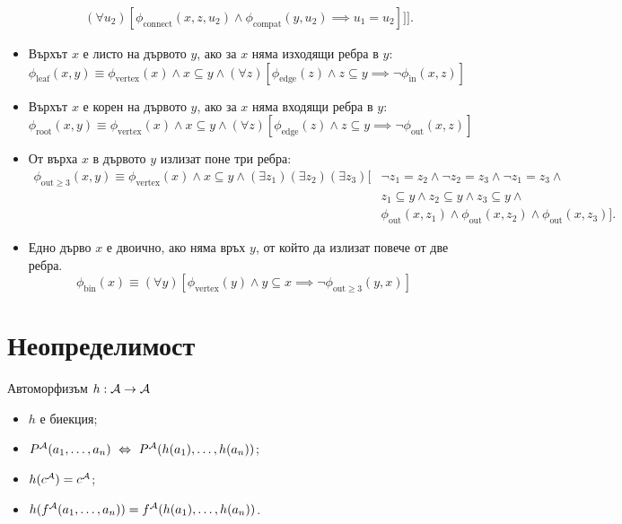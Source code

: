 \begin{problem}
\begin{itemize}
\begin{align*}
                                 & (\forall u_2)[\phi_{\text{connect}}(x,z,u_2) \land \phi_{\text{compat}}(y,u_2) \implies u_1 = u_2]]].
    \end{align*}
  \item
    Върхът $x$ е листо на дървото $y$, ако за $x$ няма изходящи ребра в $y$:
    \[\phi_{\text{leaf}}(x,y) \equiv \phi_{\text{vertex}}(x) \land x \subseteq y \land (\forall z)[\phi_{\text{edge}}(z) \land z \subseteq y \implies \neg \phi_{\text{in}}(x,z)]\]
  \item
    Върхът $x$ е корен на дървото $y$, ако за $x$ няма входящи ребра в $y$:
    \[\phi_{\text{root}}(x,y) \equiv \phi_{\text{vertex}}(x) \land x \subseteq y \land (\forall z)[\phi_{\text{edge}}(z) \land z \subseteq y \implies \neg \phi_{\text{out}}(x,z)]\]
  \item
    От върха $x$ в дървото $y$ излизат поне три ребра:
    \begin{align*}
      \phi_{\text{out}\geq 3}(x,y) \equiv \phi_{\text{vertex}}(x) \land x \subseteq y \land (\exists z_1)(\exists z_2)(\exists z_3)[ & \neg z_1 = z_2 \land \neg z_2 = z_3 \land \neg z_1 = z_3 \land \\
                                                                                                                       & z_1 \subseteq y \land z_2 \subseteq y \land z_3 \subseteq y \land\\
                                                                                                                       & \phi_{\text{out}}(x,z_1) \land \phi_{\text{out}}(x,z_2) \land \phi_{\text{out}}(x,z_3)].
    \end{align*}
  \item
    Едно дърво $x$ е двоично, ако няма връх $y$, от който да излизат повече от две ребра.
    \[\phi_{\text{bin}}(x) \equiv (\forall y)[\phi_{\text{vertex}}(y) \land y \subseteq x \implies \neg \phi_{\text{out}\geq 3}(y,x)]\]
  \end{itemize}
  
\end{problem}
  
\section{Неопределимост}

Автоморфизъм $h : \mathcal{A} \to \mathcal{A}$
\begin{itemize}
\item
  $h$ е биекция;
\item
  $P^{\mathcal{A}}(a_1,\dots,a_n) \ \Leftrightarrow\  P^{\mathcal{A}}(h(a_1),\dots,h(a_n))$;
\item
  $h(c^{\mathcal{A}}) = c^{\mathcal{A}}$;
\item
  $h(f^{\mathcal{A}}(a_1,\dots,a_n)) = f^{\mathcal{A}}(h(a_1),\dots,h(a_n))$.
\end{itemize}

